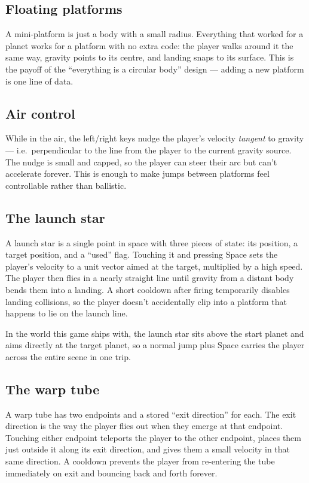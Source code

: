 \subsection*{Floating platforms}

A mini-platform is just a body with a small radius. Everything that
worked for a planet works for a platform with no extra code: the
player walks around it the same way, gravity points to its centre,
and landing snaps to its surface. This is the payoff of the
``everything is a circular body'' design --- adding a new platform is
one line of data.

\subsection*{Air control}

While in the air, the left/right keys nudge the player's velocity
\emph{tangent} to gravity --- i.e.\ perpendicular to the line from
the player to the current gravity source. The nudge is small and
capped, so the player can steer their arc but can't accelerate
forever. This is enough to make jumps between platforms feel
controllable rather than ballistic.

\subsection*{The launch star}

A launch star is a single point in space with three pieces of state:
its position, a target position, and a ``used'' flag. Touching it and
pressing Space sets the player's velocity to a unit vector aimed at
the target, multiplied by a high speed. The player then flies in a
nearly straight line until gravity from a distant body bends them
into a landing. A short cooldown after firing temporarily disables
landing collisions, so the player doesn't accidentally clip into a
platform that happens to lie on the launch line.

In the world this game ships with, the launch star sits above the
start planet and aims directly at the target planet, so a normal jump
plus Space carries the player across the entire scene in one trip.

\subsection*{The warp tube}

A warp tube has two endpoints and a stored ``exit direction'' for
each. The exit direction is the way the player flies out when they
emerge at that endpoint. Touching either endpoint teleports the
player to the other endpoint, places them just outside it along its
exit direction, and gives them a small velocity in that same
direction. A cooldown prevents the player from re-entering the tube
immediately on exit and bouncing back and forth forever.

